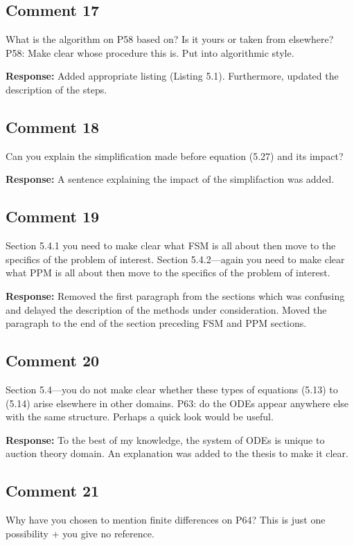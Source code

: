 \documentclass[10pt,a4paper,notitlepage]{article}
\numberwithin{equation}{section}
\begin{document}
\subsection{Comment 17}
What is the algorithm on P58 based on? Is it yours or taken from elsewhere? P58: Make clear whose procedure this is. Put into algorithmic style.

\textbf{Response:}
Added appropriate listing (Listing 5.1). Furthermore, updated the description of the steps.

\subsection{Comment 18}
Can you explain the simplification made before equation (5.27) and its impact?

\textbf{Response:}
A sentence explaining the impact of the simplifaction was added.

\subsection{Comment 19}
Section 5.4.1 you need to make clear what FSM is all about then move to the specifics of the problem of interest. Section 5.4.2---again you need to make clear what PPM is all about then move to the specifics of the problem of interest.

\textbf{Response:}
Removed the first paragraph from the sections which was confusing and delayed the description of the methods under consideration. Moved the paragraph to the end of the section preceding FSM and PPM sections.

\subsection{Comment 20}
Section 5.4---you do not make clear whether these types of equations (5.13) to (5.14) arise elsewhere in other domains. P63: do the ODEs appear anywhere else with the same structure. Perhaps a quick look would be useful.

\textbf{Response:}
To the best of my knowledge, the system of ODEs is unique to auction theory domain. An explanation was added to the thesis to make it clear.

\subsection{Comment 21}
Why have you chosen to mention finite differences on P64? This is just one possibility + you give no reference. 
\end{document}
